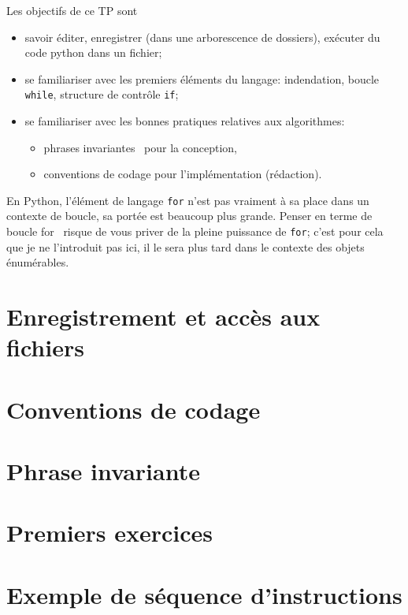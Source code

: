 

\usepackage{parcolumns}
\setlength{\parindent}{0pt}

 
Les objectifs de ce TP sont
\begin{itemize}
  \item  savoir éditer, enregistrer (dans une arborescence de dossiers), exécuter du code python dans un fichier;
  \item se familiariser avec les premiers éléments du langage: indendation, boucle \texttt{while}, structure de contrôle \texttt{if};
  \item se familiariser avec les bonnes pratiques relatives aux algorithmes:
  \begin{itemize}
    \item \og phrases invariantes\fg~ pour la conception,
    \item conventions de codage pour l'implémentation (rédaction).
  \end{itemize}
\end{itemize}
En Python, l'élément de langage \texttt{for} n'est pas vraiment à sa place dans un contexte de boucle, sa portée est beaucoup plus grande. Penser en terme de \og boucle for\fg~ risque de vous priver de la pleine puissance de \texttt{for}; c'est pour cela que je ne l'introduit pas ici, il le sera plus tard dans le contexte des objets \og énumérables\fg.


\section{Enregistrement et accès aux fichiers}


\section{Conventions de codage}


\section{Phrase invariante}


\section{Premiers exercices}


\section{Exemple de séquence d'instructions}


